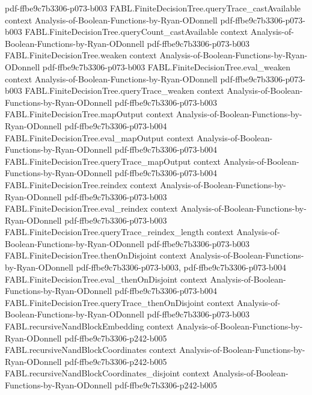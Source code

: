 \begin{theorem}
  {pdf-ffbe9c7b3306-p073-b003}
\proofstep
  {FABL.FiniteDecisionTree.queryTrace_castAvailable}
  {context}
  {Analysis-of-Boolean-Functions-by-Ryan-ODonnell}
  {pdf-ffbe9c7b3306-p073-b003}
\proofstep
  {FABL.FiniteDecisionTree.queryCount_castAvailable}
  {context}
  {Analysis-of-Boolean-Functions-by-Ryan-ODonnell}
  {pdf-ffbe9c7b3306-p073-b003}
\proofstep
  {FABL.FiniteDecisionTree.weaken}
  {context}
  {Analysis-of-Boolean-Functions-by-Ryan-ODonnell}
  {pdf-ffbe9c7b3306-p073-b003}
\proofstep
  {FABL.FiniteDecisionTree.eval_weaken}
  {context}
  {Analysis-of-Boolean-Functions-by-Ryan-ODonnell}
  {pdf-ffbe9c7b3306-p073-b003}
\proofstep
  {FABL.FiniteDecisionTree.queryTrace_weaken}
  {context}
  {Analysis-of-Boolean-Functions-by-Ryan-ODonnell}
  {pdf-ffbe9c7b3306-p073-b003}
\proofstep
  {FABL.FiniteDecisionTree.mapOutput}
  {context}
  {Analysis-of-Boolean-Functions-by-Ryan-ODonnell}
  {pdf-ffbe9c7b3306-p073-b004}
\proofstep
  {FABL.FiniteDecisionTree.eval_mapOutput}
  {context}
  {Analysis-of-Boolean-Functions-by-Ryan-ODonnell}
  {pdf-ffbe9c7b3306-p073-b004}
\proofstep
  {FABL.FiniteDecisionTree.queryTrace_mapOutput}
  {context}
  {Analysis-of-Boolean-Functions-by-Ryan-ODonnell}
  {pdf-ffbe9c7b3306-p073-b004}
\proofstep
  {FABL.FiniteDecisionTree.reindex}
  {context}
  {Analysis-of-Boolean-Functions-by-Ryan-ODonnell}
  {pdf-ffbe9c7b3306-p073-b003}
\proofstep
  {FABL.FiniteDecisionTree.eval_reindex}
  {context}
  {Analysis-of-Boolean-Functions-by-Ryan-ODonnell}
  {pdf-ffbe9c7b3306-p073-b003}
\proofstep
  {FABL.FiniteDecisionTree.queryTrace_reindex_length}
  {context}
  {Analysis-of-Boolean-Functions-by-Ryan-ODonnell}
  {pdf-ffbe9c7b3306-p073-b003}
\proofstep
  {FABL.FiniteDecisionTree.thenOnDisjoint}
  {context}
  {Analysis-of-Boolean-Functions-by-Ryan-ODonnell}
  {pdf-ffbe9c7b3306-p073-b003,
    pdf-ffbe9c7b3306-p073-b004}
\proofstep
  {FABL.FiniteDecisionTree.eval_thenOnDisjoint}
  {context}
  {Analysis-of-Boolean-Functions-by-Ryan-ODonnell}
  {pdf-ffbe9c7b3306-p073-b004}
\proofstep
  {FABL.FiniteDecisionTree.queryTrace_thenOnDisjoint}
  {context}
  {Analysis-of-Boolean-Functions-by-Ryan-ODonnell}
  {pdf-ffbe9c7b3306-p073-b003}
\proofstep
  {FABL.recursiveNandBlockEmbedding}
  {context}
  {Analysis-of-Boolean-Functions-by-Ryan-ODonnell}
  {pdf-ffbe9c7b3306-p242-b005}
\proofstep
  {FABL.recursiveNandBlockCoordinates}
  {context}
  {Analysis-of-Boolean-Functions-by-Ryan-ODonnell}
  {pdf-ffbe9c7b3306-p242-b005}
\proofstep
  {FABL.recursiveNandBlockCoordinates_disjoint}
  {context}
  {Analysis-of-Boolean-Functions-by-Ryan-ODonnell}
  {pdf-ffbe9c7b3306-p242-b005}

\end{theorem}
